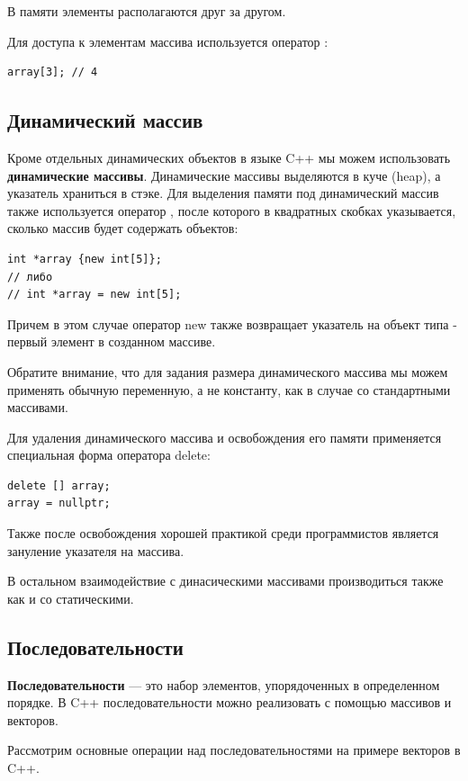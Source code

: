 В памяти элементы располагаются друг за другом.

Для доступа к элементам массива используется оператор \mverb{[]}:
\begin{verbatim}
array[3]; // 4
\end{verbatim}

\subsection{Динамический массив}

Кроме отдельных динамических объектов в языке C++ мы можем использовать \textbf{динамические массивы}. Динамические массивы выделяются в куче (heap), а указатель храниться в стэке. Для выделения памяти под динамический массив также используется оператор , после которого в квадратных скобках указывается, сколько массив будет содержать объектов:

\begin{verbatim}
int *array {new int[5]};
// либо
// int *array = new int[5];
\end{verbatim}

Причем в этом случае оператор new также возвращает указатель на объект типа  - первый элемент в созданном массиве.

Обратите внимание, что для задания размера динамического массива мы можем применять обычную переменную, а не константу, как в случае со стандартными массивами.

Для удаления динамического массива и освобождения его памяти применяется специальная форма оператора delete:
\begin{verbatim}
delete [] array;
array = nullptr;
\end{verbatim}

Также после освобождения хорошей практикой среди программистов является зануление указателя на массива.

В остальном взаимодействие с динасическими массивами производиться также как и со статическими.

\subsection{Последовательности}

\textbf{Последовательности} — это набор элементов, упорядоченных в определенном порядке. В C++ последовательности можно реализовать с помощью массивов и векторов.

Рассмотрим основные операции над последовательностями на примере векторов в C++.


